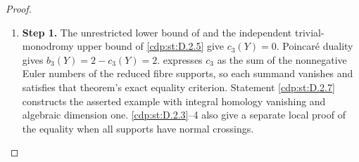 \begin{proof}
\begin{enumerate}[label={$\langle1\rangle$\arabic*.},leftmargin=*]
\item 
\noindent\textbf{Step 1.} The unrestricted lower bound of  and the independent
trivial-monodromy upper bound of \ref{cdp:st:D.2.5} give $c_3(Y)=0$.
Poincar\'e duality gives $b_3(Y)=2-c_3(Y)=2$.
 expresses $c_3$ as the sum of the nonnegative
Euler numbers of the reduced fibre supports, so each summand
vanishes and satisfies that theorem's exact equality criterion.
Statement \ref{cdp:st:D.2.7} constructs the asserted example with integral
homology vanishing and algebraic dimension one. \ref{cdp:st:D.2.3}--4 also
give a separate local proof of the equality when all supports
have normal crossings.

\end{enumerate}
\end{proof}
